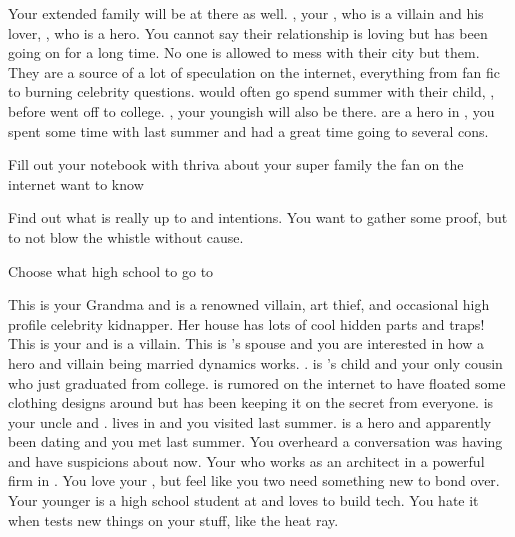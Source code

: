 \documentclass[char]{LRSguildcamp1}
\begin{document}
Your extended family will be at there as well. \cOldest{}, your \cOldest{\uncle}, who is a villain and his lover, \cOS{}, who is a hero. You cannot say their relationship is loving but has been going on for a long time. No one is allowed to mess with their city but them. They are a source of a lot of speculation on the internet, everything from fan fic to burning celebrity questions. \cTeen{} would often go spend summer with their child, \cGrad{}, before \cGrad{\they} went off to college.  \cYoungest{}, your youngish \cYoungest{\uncle} will also be there.  are a hero in \pCityYoungest{}, you spent some time with \cYoungest{\them} last summer and had a great time going to several cons.  



\begin{itemz}[Goals]
	\item Fill out your notebook with thriva about your super family the fan on the internet want to know
	\item Find out what \cAS{} is really up to and  intentions. You want to gather some proof, but to not blow the whistle without cause.
	\item Choose what high school to go to 
\end{itemz}

\begin{itemz}[Notes]
	\item 
\end{itemz}
\begin{contacts}
	\contact{\cGrandma{}} This is your Grandma and is a renowned villain, art thief, and occasional high profile celebrity kidnapper. Her house has lots of cool hidden parts and traps!
	\contact{\cOldest{}} This is your  \cOldest{\uncle} and is a villain. 
	\contact{\cOS{}} This is \cOldest{}'s spouse and you are interested in how a hero and villain being married dynamics works. \cOS{\uncle}.
	\contact{\cGrad{}} \cGrad{} is \cOldest{}'s child and your only cousin who just graduated from college. \cGrad{} is rumored on the internet to have floated some clothing designs around but has been keeping it on the secret from everyone.
	\contact{\cYoungest{}} \cYoungest{} is your uncle and \cYoungest{\hero}. \cYoungest{} lives in \pCityYoungest{} and you visited \cYoungest{\them} last summer.  
	\contact{\cYS{}} \cYS{} is a hero and apparently been dating \cYoungest{} and you met last summer. You overheard a conversation \cYS{} was having and have suspicions about  now.
	\contact{\cArchitect{}} Your \cArchitect{\parent} who works as an architect in a powerful firm in \pCityArchitect{}.  You love your \cArchitect{\parent}, but feel like you two need something new to bond over.
	 	\contact{\cTeen{}} Your younger \cTeen{\sibling} is a high school student at \pNormalSchool{} and loves to build tech. You hate it when \cTeen{} tests new things on your stuff, like the heat ray. 
\end{contacts}
\end{document}
